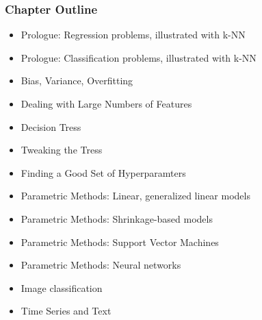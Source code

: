 \documentclass{beamer}
\begin{document}
\begin{frame} 
\frametitle{Chapter Outline}
\pause

\begin{itemize}

\item Prologue: Regression problems, illustrated with k-NN

\item Prologue: Classification problems, illustrated with k-NN

\item Bias, Variance, Overfitting

\item Dealing with Large Numbers of Features

\item Decision Tress

\item Tweaking the Tress

\item Finding a Good Set of Hyperparamters

\item Parametric Methods:  Linear, generalized linear models

\item Parametric Methods:  Shrinkage-based models

\item Parametric Methods:  Support Vector Machines

\item Parametric Methods:  Neural networks

\item Image classification

\item Time Series and Text

\end{itemize} 

\end{frame} 
\end{document}
